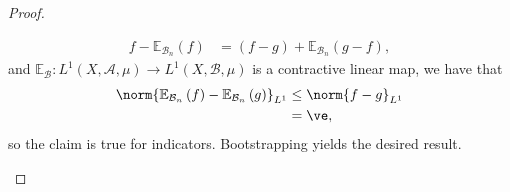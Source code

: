 \documentclass[10pt]{mypackage}
\begin{document}
\begin{proof}
\begin{enumerate}[(i)]
\begin{align*}
        f - \mathbb{E}_{\mathcal{B}_n}\left( f \right) &= \left( f-g \right) + \mathbb{E}_{\mathcal{B}_n} \left( g-f \right),
      \end{align*}
      and $ \mathbb{E}_{\mathcal{B}} \colon L^1\left( X, \mathcal{A},\mu \right)\to L^1\left( X,\mathcal{B},\mu \right)$ is a contractive linear map, we have that
      \begin{align*}
        \norm{ \mathbb{E}_{\mathcal{B}_n}\left( f \right) - \mathbb{E}_{\mathcal{B}_n}\left( g \right) }_{L^1} &\leq \norm{f-g}_{L^1}\\
                                                                                                                                &= \ve,
      \end{align*}
      so the claim is true for indicators. Bootstrapping yields the desired result.


\end{enumerate}
\end{proof}
\end{document}
